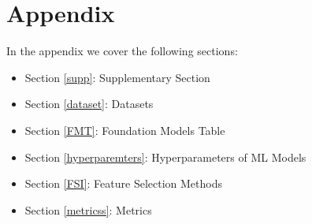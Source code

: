 \documentclass{article}
\theoremstyle{plain}
\theoremstyle{definition}
\theoremstyle{remark}
\begin{document}








\newpage
\appendix
\onecolumn
\section*{Appendix}
\label{sec:appendix}

In the appendix we cover the following sections:
\begin{itemize}
\vspace{-0.2cm}
    \item Section \ref{supp}: Supplementary Section
    \vspace{-0.2cm}
    \item Section \ref{dataset}: Datasets
    \vspace{-0.2cm}
    \item Section \ref{FMT}: Foundation Models Table
    \vspace{-0.2cm}
    \item Section \ref{hyperparemters}: Hyperparameters of ML Models
    \vspace{-0.2cm}
    \item Section \ref{FSI}: Feature Selection Methods
    \vspace{-0.2cm}
    \item Section \ref{metricss}: Metrics
\end{itemize}
\end{document}
